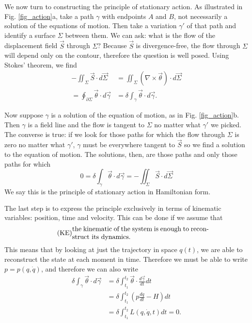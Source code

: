 \documentclass[10pt,twocolumn, nofootinbib]{revtex4-2}
\begin{document}
We now turn to constructing the principle of stationary action. As illustrated in Fig. \ref{fig_action}a, take a path $\gamma$ with endpoints $A$ and $B$, not necessarily a solution of the equations of motion. Then take a variation $\gamma'$ of that path and identify a surface $\Sigma$ between them. We can ask: what is the flow of the displacement field $\vec{S}$ through $\Sigma$? Because $\vec{S}$ is divergence-free, the flow through $\Sigma$ will depend only on the contour, therefore the question is well posed. Using Stokes' theorem, we find
\begin{equation}\label{sdof_action}
\begin{aligned}
	- \iint_{\Sigma} \vec{S} \cdot d\vec{\Sigma} &= \iint_{\Sigma} \left( \nabla \times \vec{\theta} \right) \cdot d\vec{\Sigma} \\
	=  \oint_{\partial \Sigma} \vec{\theta}  \cdot d\vec{\gamma} 
	&= \delta \int_{\gamma} \vec{\theta} \cdot d\vec{\gamma}.
\end{aligned}
\end{equation}

Now suppose $\gamma$ is a solution of the equation of motion, as in Fig. \ref{fig_action}b. Then $\gamma$ is a field line and the flow is tangent to $\Sigma$ no matter what $\gamma'$ we picked. The converse is true: if we look for those paths for which the flow through $\Sigma$ is zero no matter what $\gamma'$, $\gamma$ must be everywhere tangent to $\vec{S}$ so we find a solution to the equation of motion. The solutions, then, are those paths and only those paths for which
\begin{equation}\label{sdof_stationary_action}
	0 =\delta \int_{\gamma} \vec{\theta} \cdot d\vec{\gamma} = - \iint_{\Sigma} \vec{S} \cdot d\vec{\Sigma} 
\end{equation}
We say this is the principle of stationary action in Hamiltonian form.

The last step is to express the principle exclusively in terms of kinematic variables: position, time and velocity. This can be done if we assume that 
\begin{align}\label{assum_kineq}
	\tag*{(KE)}
	\parbox{2.8in}{the kinematic of the system is enough to reconstruct its dynamics.}
\end{align}
This means that by looking at just the trajectory in space $q(t)$, we are able to reconstruct the state at each moment in time. Therefore we must be able to write $p=p(q,\dot{q})$, and therefore we can also write
\begin{equation}\label{sdof_Lagrangian}
	\begin{aligned}
		\delta \int_{\gamma} \vec{\theta} \cdot d\vec{\gamma} 
		&= \delta \int^{t_2}_{t_1} \vec{\theta} \cdot \frac{d\vec{\gamma}}{dt} dt \\  
		&= \delta \int^{t_2}_{t_1} \left(p \frac{dq}{dt} - H \right) dt \\
		&= \delta \int^{t_2}_{t_1}L(q, \dot{q}, t) dt = 0.
	\end{aligned}
\end{equation}
\end{document}
